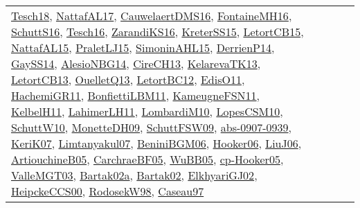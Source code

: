 {\begin{longtable}{lp{3cm}>{\raggedright}p{6cm}>{\raggedright}p{6cm}p{8cm}}
\href{papers/Tesch18.pdf}{Tesch18}\cite{Tesch18}, \href{articles/NattafAL17.pdf}{NattafAL17}\cite{NattafAL17}, \href{papers/CauwelaertDMS16.pdf}{CauwelaertDMS16}\cite{CauwelaertDMS16}, \href{papers/FontaineMH16.pdf}{FontaineMH16}\cite{FontaineMH16}, \href{papers/SchuttS16.pdf}{SchuttS16}\cite{SchuttS16}, \href{papers/Tesch16.pdf}{Tesch16}\cite{Tesch16}, \href{articles/ZarandiKS16.pdf}{ZarandiKS16}\cite{ZarandiKS16}, \href{papers/KreterSS15.pdf}{KreterSS15}\cite{KreterSS15}, \href{articles/LetortCB15.pdf}{LetortCB15}\cite{LetortCB15}, \href{articles/NattafAL15.pdf}{NattafAL15}\cite{NattafAL15}, \href{papers/PraletLJ15.pdf}{PraletLJ15}\cite{PraletLJ15}, \href{articles/SimoninAHL15.pdf}{SimoninAHL15}\cite{SimoninAHL15}, \href{papers/DerrienP14.pdf}{DerrienP14}\cite{DerrienP14}, \href{papers/GaySS14.pdf}{GaySS14}\cite{GaySS14}, \href{papers/AlesioNBG14.pdf}{AlesioNBG14}\cite{AlesioNBG14}, \href{papers/CireCH13.pdf}{CireCH13}\cite{CireCH13}, \href{papers/KelarevaTK13.pdf}{KelarevaTK13}\cite{KelarevaTK13}, \href{papers/LetortCB13.pdf}{LetortCB13}\cite{LetortCB13}, \href{papers/OuelletQ13.pdf}{OuelletQ13}\cite{OuelletQ13}, \href{papers/LetortBC12.pdf}{LetortBC12}\cite{LetortBC12}, \href{papers/EdisO11.pdf}{EdisO11}\cite{EdisO11}, \href{articles/HachemiGR11.pdf}{HachemiGR11}\cite{HachemiGR11}, \href{papers/BonfiettiLBM11.pdf}{BonfiettiLBM11}\cite{BonfiettiLBM11}, \href{papers/KameugneFSN11.pdf}{KameugneFSN11}\cite{KameugneFSN11}, \href{articles/KelbelH11.pdf}{KelbelH11}\cite{KelbelH11}, \href{papers/LahimerLH11.pdf}{LahimerLH11}\cite{LahimerLH11}, \href{papers/LombardiM10.pdf}{LombardiM10}\cite{LombardiM10}, \href{articles/LopesCSM10.pdf}{LopesCSM10}\cite{LopesCSM10}, \href{papers/SchuttW10.pdf}{SchuttW10}\cite{SchuttW10}, \href{papers/MonetteDH09.pdf}{MonetteDH09}\cite{MonetteDH09}, \href{papers/SchuttFSW09.pdf}{SchuttFSW09}\cite{SchuttFSW09}, \href{articles/abs-0907-0939.pdf}{abs-0907-0939}\cite{abs-0907-0939}, \href{papers/KeriK07.pdf}{KeriK07}\cite{KeriK07}, \href{papers/Limtanyakul07.pdf}{Limtanyakul07}\cite{Limtanyakul07}, \href{papers/BeniniBGM06.pdf}{BeniniBGM06}\cite{BeniniBGM06}, \href{articles/Hooker06.pdf}{Hooker06}\cite{Hooker06}, \href{papers/LiuJ06.pdf}{LiuJ06}\cite{LiuJ06}, \href{papers/ArtiouchineB05.pdf}{ArtiouchineB05}\cite{ArtiouchineB05}, \href{papers/CarchraeBF05.pdf}{CarchraeBF05}\cite{CarchraeBF05}, \href{papers/WuBB05.pdf}{WuBB05}\cite{WuBB05}, \href{papers/cp-Hooker05.pdf}{cp-Hooker05}\cite{cp-Hooker05}, \href{papers/ValleMGT03.pdf}{ValleMGT03}\cite{ValleMGT03}, \href{papers/Bartak02a.pdf}{Bartak02a}\cite{Bartak02a}, \href{papers/Bartak02.pdf}{Bartak02}\cite{Bartak02}, \href{papers/ElkhyariGJ02.pdf}{ElkhyariGJ02}\cite{ElkhyariGJ02}, \href{articles/HeipckeCCS00.pdf}{HeipckeCCS00}\cite{HeipckeCCS00}, \href{papers/RodosekW98.pdf}{RodosekW98}\cite{RodosekW98}, \href{papers/Caseau97.pdf}{Caseau97}\cite{Caseau97}\\

\end{longtable}}
